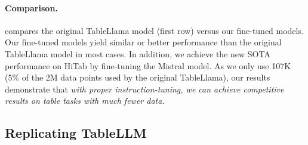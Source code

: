 \documentclass[11pt]{article}
\newcommand{\zshe}[1]{\textcolor{red}{[sheng: #1]}}
\begin{document}
\paragraph{Comparison.}
 compares the original TableLlama model (first row) versus our fine-tuned models.
Our fine-tuned models yield similar or better performance than the original TableLlama model in most cases.
In addition, we achieve the new SOTA performance on HiTab by fine-tuning the Mistral model.
As we only use 107K (5\% of the 2M data points used by the original TableLlama), our results demonstrate that \textit{with proper instruction-tuning, we can achieve competitive results on table tasks with much fewer data.}

\subsection{Replicating TableLLM}
\end{document}
